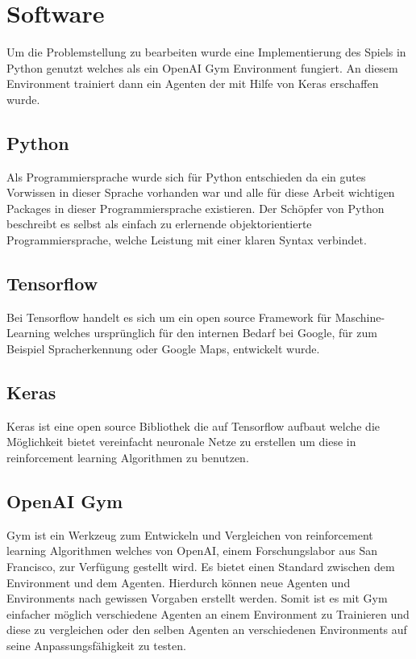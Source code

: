 





\section{Software}
Um die Problemstellung zu bearbeiten wurde eine Implementierung des Spiels in Python genutzt welches als ein OpenAI Gym Environment fungiert. An diesem Environment trainiert dann ein Agenten der mit Hilfe von  Keras erschaffen wurde.

\subsection{Python}
Als Programmiersprache wurde sich für Python\cite{python} entschieden da ein gutes Vorwissen in dieser Sprache vorhanden war und alle für diese Arbeit wichtigen Packages in dieser Programmiersprache existieren.
Der Schöpfer von Python beschreibt es selbst als einfach zu erlernende objektorientierte Programmiersprache, welche Leistung mit einer klaren Syntax verbindet.\cite{PythonManual2009} \\

\subsection{Tensorflow}
Bei Tensorflow \cite{tensorflow} handelt es sich um ein open source Framework für Maschine-Learning welches ursprünglich für den internen Bedarf bei Google, für zum Beispiel Spracherkennung oder Google Maps, entwickelt wurde. 

\subsection{Keras}
Keras\cite{keras} ist eine open source Bibliothek die auf Tensorflow aufbaut welche die Möglichkeit bietet vereinfacht neuronale Netze zu erstellen um diese in reinforcement learning Algorithmen zu benutzen.

\subsection{OpenAI Gym}
Gym \cite{gym} ist ein Werkzeug zum Entwickeln und Vergleichen von reinforcement learning Algorithmen welches von OpenAI, einem Forschungslabor aus San Francisco, zur Verfügung gestellt wird. Es bietet einen Standard zwischen dem Environment und dem Agenten. Hierdurch können neue Agenten und Environments nach gewissen Vorgaben erstellt werden. Somit ist es mit Gym einfacher möglich verschiedene Agenten an einem Environment zu Trainieren und diese zu vergleichen oder den selben Agenten an verschiedenen Environments auf seine Anpassungsfähigkeit zu testen.

